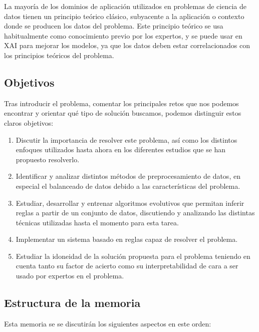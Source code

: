 La mayoría de los dominios de aplicación utilizados en problemas de ciencia de datos tienen un principio teórico clásico, subyacente a la aplicación o contexto donde se producen los datos del problema. Este principio teórico se usa habitualmente como conocimiento previo por los expertos, y se puede usar en XAI para mejorar los modelos, ya que los datos deben estar correlacionados con los principios teóricos del problema.

\newpage

\subsection{Objetivos}

Tras introducir el problema, comentar los principales retos que nos podemos encontrar y orientar qué tipo de solución buscamos, podemos distinguir estos claros objetivos:

\begin{enumerate}
	\item Discutir la importancia de resolver este problema, así como los distintos enfoques utilizados hasta ahora en los diferentes estudios que se han propuesto resolverlo.
	\item Identificar y analizar distintos métodos de preprocesamiento de datos, en especial el balanceado de datos debido a las características del problema.
	\item Estudiar, desarrollar y entrenar algoritmos evolutivos que permitan inferir reglas a partir de un conjunto de datos, discutiendo y analizando las distintas técnicas utilizadas hasta el momento para esta tarea.
	\item Implementar un sistema basado en reglas capaz de resolver el problema.
	\item Estudiar la idoneidad de la solución propuesta para el problema teniendo en cuenta tanto su factor de acierto como su interpretabilidad de cara a ser usado por expertos en el problema.
\end{enumerate}

\subsection{Estructura de la memoria}

Esta memoria se se discutirán los siguientes aspectos en este orden:

